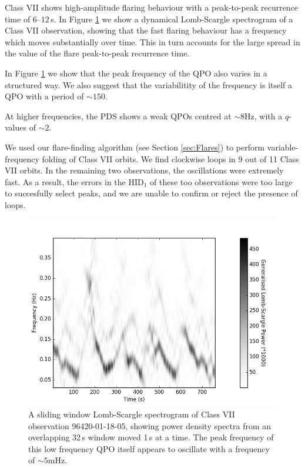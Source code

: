 \par Class VII shows high-amplitude flaring behaviour with a peak-to-peak recurrence time of $6$--$12$\,s.  In Figure \ref{fig:spect} we show a dynamical Lomb-Scargle spectrogram of a Class VII observation, showing that the fast flaring behaviour has a frequency which moves substantially over time.  This in turn accounts for the large spread in the value of the flare peak-to-peak recurrence time.
\par In Figure \ref{fig:spect} we show that the peak frequency of the QPO also varies in a structured way.  We also suggest that the variabilitity of the frequency is itself a QPO with a period of $\sim150$.
\par At higher frequencies, the PDS shows a weak QPOs centred at $\sim8$Hz, with a $q$-values of $\sim2$.
\par We used our flare-finding algorithm (see Section \ref{sec:Flares}) to perform variable-frequency folding of Class VII orbits.  We find clockwise loops in 9 out of 11 Class VII orbits.  In the remaining two observations, the oscillations were extremely fast.  As a result, the errors in the HID$_1$ of these too observations were too large to succesfully select peaks, and we are unable to confirm or reject the presence of loops.

\begin{figure}
    \includegraphics[width=0.8\columnwidth, trim = 0.6cm 0 3.9cm 0]{images/N_sgram.png}
    \captionsetup{singlelinecheck=off}
    \caption{A sliding window  Lomb-Scargle spectrogram of Class VII observation 96420-01-18-05, showing power density spectra from an overlapping 32\,s window moved 1\,s at a time.  The peak frequency of this low frequency QPO itself appears to oscillate with a frequency of $\sim5$mHz.}
   \label{fig:spect}
\end{figure}

